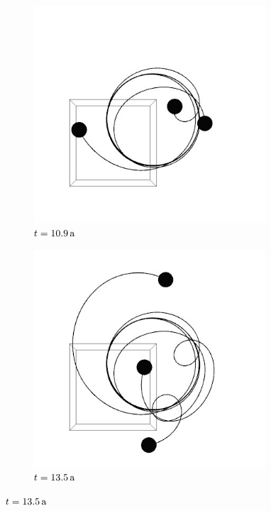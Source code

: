 \begin{figure}[h]
      \begin{subfigure}[b]{0.49\textwidth}
        \center
        \includegraphics[width=0.95\textwidth]{pictures/three_body/triangle_3.jpg}
        \caption{$t=10.9\,\mathrm{a}$}
      \end{subfigure}
      \begin{subfigure}[b]{0.49\textwidth}
        \center
        \includegraphics[width=0.95\textwidth]{pictures/three_body/triangle_4.jpg}
        \caption{$t=13.5\,\mathrm{a}$}
      \end{subfigure}


\end{figure}
